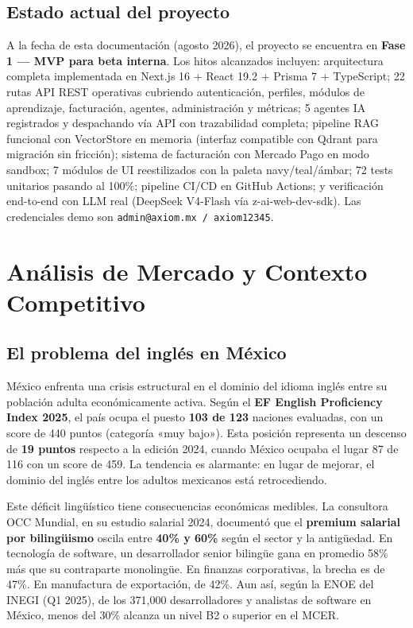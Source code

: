 \documentclass[10pt,a4paper,oneside]{report}
\begin{document}
\section{Estado actual del proyecto}
A la fecha de esta documentación (agosto 2026), el proyecto se encuentra en \textbf{Fase 1 — MVP para beta interna}. Los hitos alcanzados incluyen: arquitectura completa implementada en Next.js 16 + React 19.2 + Prisma 7 + TypeScript; 22 rutas API REST operativas cubriendo autenticación, perfiles, módulos de aprendizaje, facturación, agentes, administración y métricas; 5 agentes IA registrados y despachando vía API con trazabilidad completa; pipeline RAG funcional con VectorStore en memoria (interfaz compatible con Qdrant para migración sin fricción); sistema de facturación con Mercado Pago en modo sandbox; 7 módulos de UI reestilizados con la paleta navy/teal/ámbar; 72 tests unitarios pasando al 100\%; pipeline CI/CD en GitHub Actions; y verificación end-to-end con LLM real (DeepSeek V4-Flash vía z-ai-web-dev-sdk). Las credenciales demo son \texttt{admin@axiom.mx / axiom12345}.


\chapter{Análisis de Mercado y Contexto Competitivo}

\section{El problema del inglés en México}
México enfrenta una crisis estructural en el dominio del idioma inglés entre su población adulta económicamente activa. Según el \textbf{EF English Proficiency Index 2025}, el país ocupa el puesto \textbf{103 de 123} naciones evaluadas, con un score de 440 puntos (categoría «muy bajo»). Esta posición representa un descenso de \textbf{19 puntos} respecto a la edición 2024, cuando México ocupaba el lugar 87 de 116 con un score de 459. La tendencia es alarmante: en lugar de mejorar, el dominio del inglés entre los adultos mexicanos está retrocediendo.

Este déficit lingüístico tiene consecuencias económicas medibles. La consultora OCC Mundial, en su estudio salarial 2024, documentó que el \textbf{premium salarial por bilingüismo} oscila entre \textbf{40\% y 60\%} según el sector y la antigüedad. En tecnología de software, un desarrollador senior bilingüe gana en promedio 58\% más que su contraparte monolingüe. En finanzas corporativas, la brecha es de 47\%. En manufactura de exportación, de 42\%. Aun así, según la ENOE del INEGI (Q1 2025), de los 371,000 desarrolladores y analistas de software en México, menos del 30\% alcanza un nivel B2 o superior en el MCER.
\end{document}
